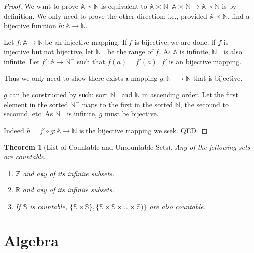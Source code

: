 \documentclass[12pt, a4paper]{report}
\newtheorem{theorem}{Theorem}[section]
\theoremstyle{definition}
\theoremstyle{definition}
\theoremstyle{remark}
\begin{document}
\begin{proof}
	We want to prove $\mathbb{A} \prec \mathbb{N}$ is equivalent to $\mathbb{A} \asymp \mathbb{N}$. $\mathbb{A} \asymp \mathbb{N} \rightarrow \mathbb{A} \prec \mathbb{N}$ is by definition. 
	We only need to prove the other direction; i.e., provided $\mathbb{A} \prec \mathbb{N}$, find a bijective function $h: \mathbb{A} \rightarrow \mathbb{N}$.

	Let $f: \mathbb{A} \rightarrow \mathbb{N}$ be an injective mapping. If $f$ is bijective, we are done. If $f$ is injective but not bijective, let $\mathbb{N}^-$ be the range of $f.$ As $\mathbb{A}$ is infinite, $\mathbb{N}^-$ is also infinite.  
	Let $f': \mathbb{A} \rightarrow \mathbb{N}^-$ such that $f(a) = f'(a).$ $f'$ is an bijective mapping. 
	
    Thus we only need to show there exists a mapping $g: \mathbb{N}^- \rightarrow \mathbb{N}$ that is bijective. 

	$g$ can be constructed by such: sort $\mathbb{N}^-$ and $\mathbb{N}$ in ascending order. Let the first element in the sorted $\mathbb{N}^-$ maps to the first in the sorted $\mathbb{N}$, the secound to secound, etc.
	As $\mathbb{N}^-$ is infinite, $g$ must be bijective.

	Indeed $h = f' \circ g: \mathbb{A} \rightarrow \mathbb{N}$ is the bijective mapping we seek. QED. 
\end{proof}

\begin{theorem}[List of Countable and Uncountable Sets]
	Any of the following sets are countable.
	\begin{enumerate}
		\item $\mathbb{Z}$ and any of its infinite subsets.
		\item $\mathbb{R}$ and any of its infinite subsets.
		\item If $\mathbb{S}$ is countable, $\{\mathbb{S}\times \mathbb{S}\}, \{\mathbb{S}\times \mathbb{S}\times \dots \times \mathbb{S}) \}$ are also countable.
	\end{enumerate}
\end{theorem}

\chapter{Algebra}
\end{document}
